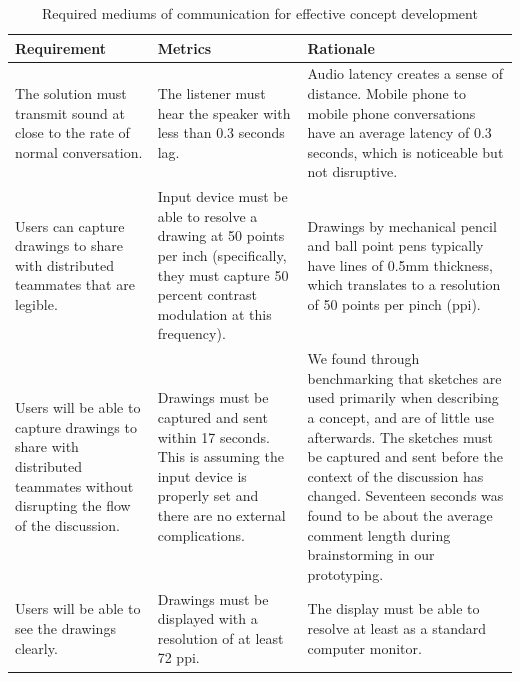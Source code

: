 \begin{table}[!h]
	\centering
		\begin{tabular}{| p{42mm} | p{42mm} | p{51mm} |}
		\hline
		\textbf{Requirement}	& \textbf{Metrics} & \textbf{Rationale} \\
		\hline
The solution must transmit sound at close to the rate of normal conversation. &	The listener must hear the speaker with less than 0.3 seconds lag.	& Audio latency creates a sense of distance. Mobile phone to mobile phone conversations have an average latency of 0.3 seconds, which is noticeable but not disruptive. \\ \hline
Users can capture drawings to share with distributed teammates that are legible. &	Input device must be able to resolve a drawing at 50 points per inch (specifically, they must capture 50 percent contrast modulation at this frequency). &	Drawings by mechanical pencil and ball point pens typically have lines of 0.5mm thickness, which translates to a resolution of 50 points per pinch (ppi).\\ \hline
Users will be able to capture drawings to share with distributed teammates without disrupting the flow of the discussion. & Drawings must be captured and sent within 17 seconds. This is assuming the input device is properly set and there are no external complications. &	We found through benchmarking that sketches are used primarily when describing a concept, and are of little use afterwards. The sketches must be captured and sent before the context of the discussion has changed. Seventeen seconds was found to be about the average comment length during brainstorming in our prototyping. \\ \hline
Users will be able to see the drawings clearly. &	Drawings must be displayed with a resolution of at least 72 ppi.&	The display must be able to resolve at least as a standard computer monitor.\\ 
\hline
		\end{tabular}
	\caption{Required mediums of communication for effective concept development}
	\label{tab:mediums2}
\end{table}

